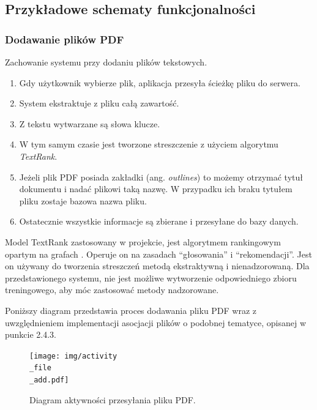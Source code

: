 \documentclass[12pt,a4paper,twoside]{article}
\begin{document}
\subsection{Przykładowe schematy funkcjonalności}
\subsubsection*{Dodawanie plików PDF}
Zachowanie systemu przy dodaniu plików tekstowych.
\begin{enumerate}
	\item Gdy użytkownik wybierze plik, aplikacja przesyła ścieżkę pliku do serwera.
	\item System ekstraktuje z pliku całą zawartość.
	\item Z tekstu wytwarzane są słowa klucze.
	\item W tym samym czasie jest tworzone streszczenie z użyciem algorytmu \textit{TextRank}.
	\item Jeżeli plik PDF posiada zakładki (ang. \textit{outlines}) to możemy otrzymać tytuł dokumentu i nadać plikowi taką nazwę. W przypadku ich braku tytułem pliku zostaje bazowa nazwa pliku.
	\item Ostatecznie wszystkie informacje są zbierane i przesyłane do bazy danych.
\end{enumerate}
Model TextRank zastosowany w projekcie, jest algorytmem rankingowym opartym na grafach \cite{textrank}. Operuje on na zasadach ``głosowania'' i ``rekomendacji''. Jest on używany do tworzenia streszczeń metodą ekstraktywną i nienadzorowaną. Dla przedstawionego systemu, nie jest możliwe wytworzenie odpowiedniego zbioru treningowego, aby móc zastosować metody nadzorowane. \par
Poniższy diagram przedstawia proces dodawania pliku PDF wraz z uwzględnieniem implementacji asocjacji plików o podobnej tematyce, opisanej w punkcie 2.4.3.
\begin{figure}[h!]
\centering
  \texttt{[image: img/activity\\\_file\\\_add.pdf]}
  \caption{Diagram aktywności przesyłania pliku PDF.}
\end{figure}
\clearpage
\newpage
\end{document}
